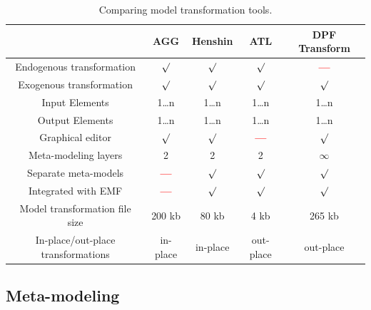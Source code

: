 \begin{table}[ht]
\renewcommand*\arraystretch{1.2}
\centering
\begin{tabular}{| c | c | c | c | c |}
\hline
& AGG & Henshin & ATL & DPF Transform \\
\hline
Endogenous transformation & $\surd$ & $\surd$ & $\surd$ & \textcolor{red}{\textbf{---}}\\

Exogenous transformation & $\surd$ & $\surd$ & $\surd$ & $\surd$\\

Input Elements & 1\ldots n & 1\ldots n & 1\ldots n & 1\ldots n\\

Output Elements & 1\ldots n & 1\ldots n & 1\ldots n & 1\ldots n\\

Graphical editor & $\surd$ & $\surd$ & \textcolor{red}{\textbf{---}} & $\surd$
\\

Meta-modeling layers & 2 & 2 & 2 & $\infty$ \\

Separate meta-models & \textcolor{red}{\textbf{---}} &  $\surd$ &  $\surd$ &  $\surd$ \\

Integrated with EMF & \textcolor{red}{\textbf{---}} & $\surd$ & $\surd$ & $\surd$ \\ 

Model transformation file size & 200 kb & 80 kb & 4 kb & 265 kb\\

In-place/out-place transformations & in-place &
in-place & out-place  & out-place \\

\hline
\end{tabular}
\caption{Comparing model transformation tools.}
\label{tab:comparing}
\end{table} 

\subsection{Meta-modeling}

